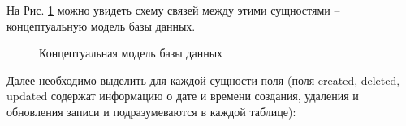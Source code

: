\documentclass[a4paper,12pt]{article}
\begin{document}
На Рис. \ref{fig:database_c} можно увидеть схему связей между этими сущностями -- концептуальную модель базы данных.

\begin{figure}[ht]
    \caption{Концептуальная модель базы данных}
    \label{fig:database_c}
\end{figure}

Далее необходимо выделить для каждой сущности поля (поля created, deleted, updated содержат информацию о дате и времени создания, удаления и обновления записи и подразумеваются в каждой таблице):
\end{document}
